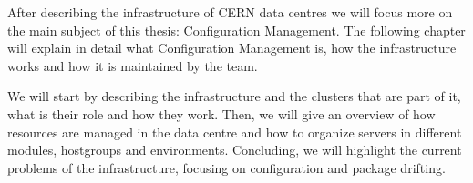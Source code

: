 
After describing the infrastructure of CERN data centres we will focus
more on the main subject of this thesis: Configuration Management. The
following chapter will explain in detail what Configuration Management is,
how the infrastructure works and how it is maintained by the team.

We will start by describing the infrastructure and the clusters that are
part of it, what is their role and how they work. Then, we will
give an overview of how resources are managed in the data centre and how
to organize servers in different modules, hostgroups and environments.
Concluding, we will highlight the current problems of the infrastructure,
focusing on configuration and package drifting.
